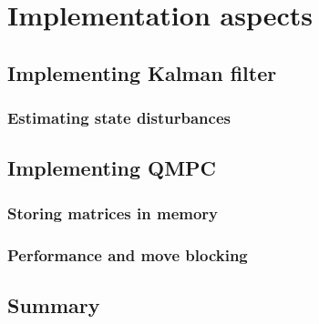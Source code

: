 \section{Implementation aspects}
\label{cap:Implementation}

\subsection{Implementing Kalman filter}

\subsubsection{Estimating state disturbances}

\subsection{Implementing QMPC}

\subsubsection{Storing matrices in memory}

\subsubsection{Performance and move blocking}

\subsection{Summary}